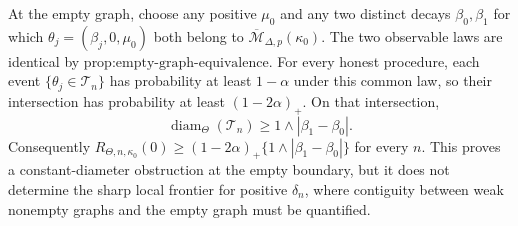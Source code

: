 At the empty graph, choose any positive \(\mu_0\) and any two distinct decays \(\beta_0,\beta_1\) for which \(\theta_j=(\beta_j,0,\mu_0)\) both belong to \(\overline{\mathcal M}_{\Delta,p}(\kappa_0)\).  The two observable laws are identical by \(\text{prop:empty-graph-equivalence}\).  For every honest procedure, each event \(\{\theta_j\in\mathcal T_n\}\) has probability at least \(1-\alpha\) under this common law, so their intersection has probability at least \((1-2\alpha)_+\).  On that intersection,
\[
 \operatorname{diam}_\Theta(\mathcal T_n)\geq1\wedge|\beta_1-\beta_0|.
\]
Consequently \(R_{\Theta,n,\kappa_0}(0)\geq(1-2\alpha)_+\{1\wedge|\beta_1-\beta_0|\}\) for every \(n\).  This proves a constant-diameter obstruction at the empty boundary, but it does not determine the sharp local frontier for positive \(\delta_n\), where contiguity between weak nonempty graphs and the empty graph must be quantified.